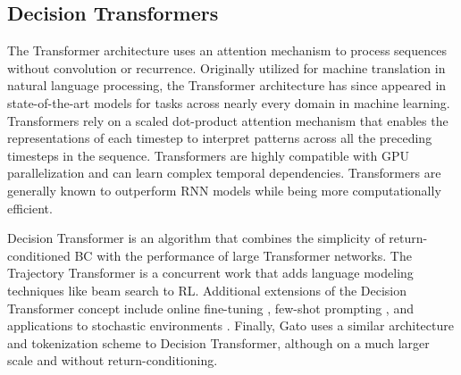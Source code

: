 \subsection{Decision Transformers}
The Transformer architecture \cite{transformer} uses an attention mechanism to process sequences without convolution or recurrence. Originally utilized for machine translation in natural language processing, the Transformer architecture has since appeared in state-of-the-art models for tasks across nearly every domain in machine learning. Transformers rely on a scaled dot-product attention mechanism that enables the representations of each timestep to interpret patterns across all the preceding timesteps in the sequence. Transformers are highly compatible with GPU parallelization and can learn complex temporal dependencies. Transformers are generally known to outperform RNN models while being more computationally efficient.

Decision Transformer \cite{decisiontransformer} is an algorithm that combines the simplicity of return-conditioned BC with the performance of large Transformer networks. The Trajectory Transformer \cite{trajectorytransformer} is a concurrent work that adds language modeling techniques like beam search to RL. Additional extensions of the Decision Transformer concept include online fine-tuning \cite{online_decisiontransformer}, few-shot prompting \cite{xu2022prompting}, and applications to stochastic environments \cite{esper}. Finally, Gato \cite{gato} uses a similar architecture and tokenization scheme to Decision Transformer, although on a much larger scale and without return-conditioning.